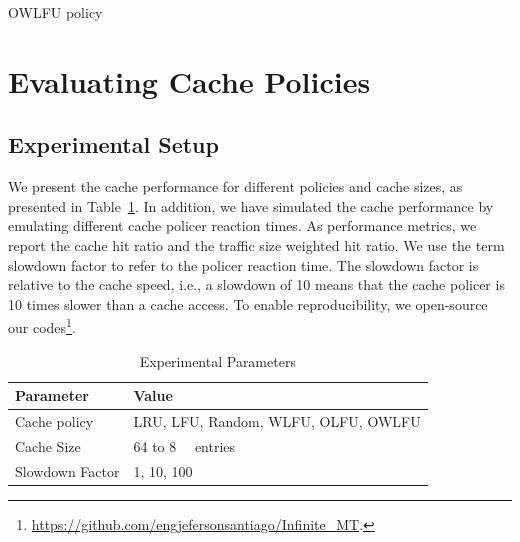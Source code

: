 \begin{algorithm}[]
\caption{OWLFU policy}
\label{algo:owlfu}
\SetInd{0.1em}{.9em}
\SetAlgoLined
\footnotesize
{}
%
%
%
%
%
\end{algorithm}

\section{Evaluating Cache Policies}\label{sec:cache_results}

\subsection{Experimental Setup}
We present the cache performance for different policies and cache sizes, as presented in Table~\ref{tab:setup}.
In addition, we have simulated the cache performance by emulating different cache policer reaction times.
As performance metrics, we report the cache hit ratio and the traffic size weighted hit ratio.
We use the term slowdown factor to refer to the policer reaction time.
The slowdown factor is relative to the cache speed, i.e., a slowdown of 10 means that the cache policer is 10 times slower than a cache access.
To enable reproducibility, we open-source our codes\footnote{\url{https://github.com/engjefersonsantiago/Infinite_MT}.}.

\begin{table}[]
	\centering
	\caption{Experimental Parameters}
	\label{tab:setup}
	\begin{tabular}{|l|l|}
		\hline
		\textbf{Parameter}       & \textbf{Value}   \\
		\hline
		Cache policy            & LRU, LFU, Random, WLFU, OLFU, OWLFU    \\
		Cache Size              & 64 to \SI{8}{\kilo\nothing} entries  \\
		Slowdown Factor         & 1, 10, 100        \\
		\hline
	\end{tabular}
\end{table}


